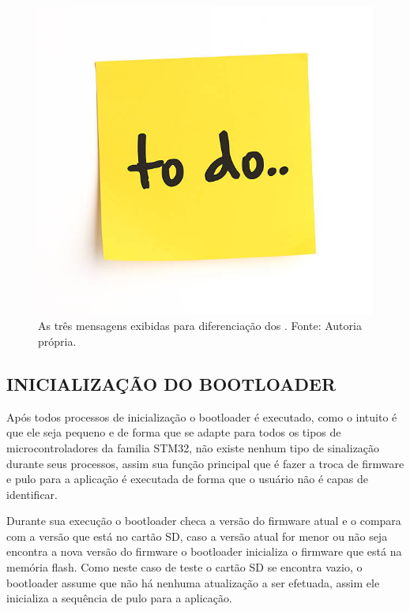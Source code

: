 \begin{figure}[H]
    \scriptsize
     \centering
     \includegraphics[scale=1.2]{dados/figuras/ToDo.jpg}
     \caption{As três mensagens exibidas para diferenciação dos \firmware. \newline Fonte: Autoria própria.}
     \label{memoriaflash}
\end{figure}

\subsection{INICIALIZAÇÃO DO BOOTLOADER}
Após todos processos de inicialização o bootloader é executado, como o intuito é que ele seja pequeno e de forma que se adapte para todos os tipos de microcontroladores da familia STM32, não existe nenhum tipo de sinalização durante seus processos, assim sua função principal que é fazer a troca de firmware e pulo para a aplicação é executada de forma que o usuário não é capas de identificar.

Durante sua execução o bootloader checa a versão do firmware atual e o compara com a versão que está no cartão SD, caso a versão atual for menor ou não seja encontra a nova versão do firmware o bootloader inicializa o firmware que está na memória flash. Como neste caso de teste o cartão SD se encontra vazio, o bootloader assume que não há nenhuma atualização a ser efetuada, assim ele inicializa a sequência de pulo para a aplicação. 
